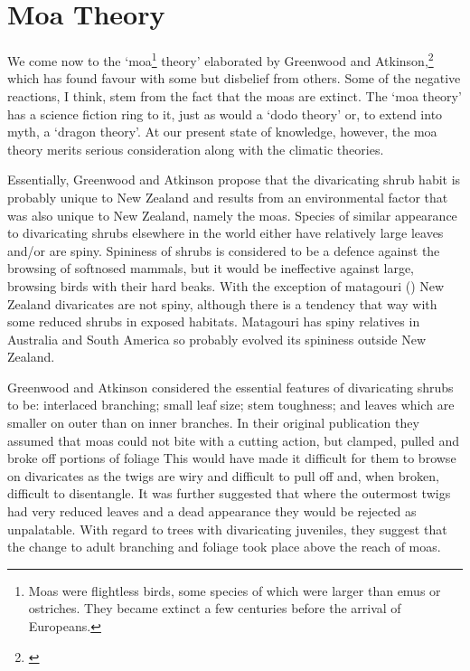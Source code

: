 \section{Moa Theory}

We come now to the `moa\footnote{Moas were flightless birds, some species of which were larger than emus or ostriches. They became extinct a few centuries before the arrival of Europeans.} theory' elaborated by Greenwood and Atkinson,\footnote{\cite{greenwood1977evolution}} which has found favour with some but disbelief from others.
Some of the negative reactions, I think, stem from the fact that the moas are extinct.
The `moa theory' has a science fiction ring to it, just as would a `dodo theory' or, to extend into myth, a `dragon theory'.
At our present state of knowledge, however, the moa theory merits serious consideration along with the climatic theories.

Essentially, Greenwood and Atkinson propose that the divaricating shrub habit is probably unique to New Zealand and results from an environmental factor that was also unique to New Zealand, namely the moas.
Species of similar appearance to divaricating shrubs elsewhere in the world either have relatively large leaves and/or are spiny.
Spininess of shrubs is considered to be a defence against the browsing of softnosed mammals, but it would be ineffective against large, browsing birds with their hard beaks.
With the exception of matagouri () New Zealand divaricates are not spiny, although there is a tendency that way with some reduced shrubs in exposed habitats.  Matagouri has spiny relatives in Australia and South America so probably evolved its spininess outside New Zealand.

Greenwood and Atkinson considered the essential features of divaricating shrubs to be: interlaced branching; small leaf size; stem toughness; and leaves which are smaller on outer than on inner branches.
In their original publication they assumed that moas could not bite with a cutting action, but clamped, pulled and broke off portions of foliage This would have made it difficult for them to browse on divaricates as the twigs are wiry and difficult to pull off and, when broken, difficult to disentangle.
It was further suggested that where the outermost twigs had very reduced leaves and a dead appearance they would be rejected as unpalatable.
With regard to trees with divaricating juveniles, they suggest that the change to adult branching and foliage took place above the reach of moas.

